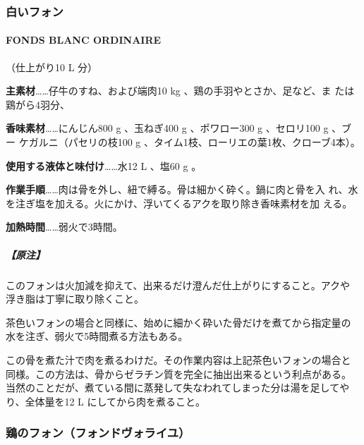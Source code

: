 \documentclass[twoside,12Q,b5j]{escoffierltjsbook}
\newenvironment{recette}{\begin{multicols}{2}}{\end{multicols}}
\begin{document}
\begin{recette}
\vspace*{2\zw}

\subsubsection{白いフォン}\label{ux767dux3044ux30d5ux30a9ux30f3}

\paragraph{FONDS BLANC ORDINAIRE}\label{fonds-blanc-ordinaire}


（仕上がり10 L 分）

\textbf{主素材}\ldots{}\ldots{}仔牛のすね、および端肉10 kg
、鶏の手羽やとさか、足など、ま たは鶏がら4羽分、

\textbf{香味素材}\ldots{}\ldots{}にんじん800 g 、玉ねぎ400 g
、ポワロー300 g 、セロリ100 g 、ブー ケガルニ（パセリの枝100 g
、タイム1枝、ローリエの葉1枚、クローブ4本）。

\textbf{使用する液体と味付け}\ldots{}\ldots{}水12 L 、塩60 g 。

\textbf{作業手順}\ldots{}\ldots{}肉は骨を外し、紐で縛る。骨は細かく砕く。鍋に肉と骨を入
れ、水を注ぎ塩を加える。火にかけ、浮いてくるアクを取り除き香味素材を加
える。

\textbf{加熱時間}\ldots{}\ldots{}弱火で3時間。

\subparagraph{【原注】}\label{ux539fux6ce8-1}

このフォンは火加減を抑えて、出来るだけ澄んだ仕上がりにすること。アクや
浮き脂は丁寧に取り除くこと。

茶色いフォンの場合と同様に、始めに細かく砕いた骨だけを煮てから指定量の
水を注ぎ、弱火で5時間煮る方法もある。

この骨を煮た汁で肉を煮るわけだ。その作業内容は上記茶色いフォンの場合と
同様。この方法は、骨からゼラチン質を完全に抽出出来るという利点がある。
当然のことだが、煮ている間に蒸発して失なわれてしまった分は湯を足してや
り、全体量を12 L にしてから肉を煮ること。

\vspace*{2\zw}

\subsubsection{鶏のフォン（フォンドヴォライユ）}\label{ux9d8fux306eux30d5ux30a9ux30f3ux30d5ux30a9ux30f3ux30c9ux30f4ux30a9ux30e9ux30a4ux30e6}


\end{recette}
\end{document}
